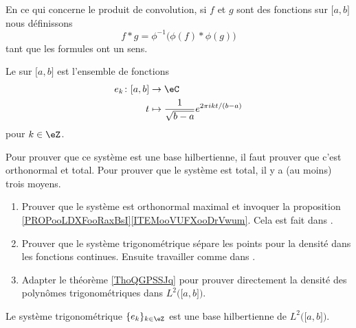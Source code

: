 \begin{definition}
	En ce qui concerne le produit de convolution, si \( f\) et \( g\) sont des fonctions sur \( \mathopen[ a , b \mathclose]\) nous définissons
	\begin{equation}
		f*g=\phi^{-1}\big( \phi(f)*\phi(g) \big)
	\end{equation}
	tant que les formules ont un sens.
\end{definition}

\begin{definition}
	Le  sur \( \mathopen[ a , b \mathclose]\) est l'ensemble de fonctions
	\begin{equation}
		\begin{aligned}
			e_k\colon \mathopen[ a , b \mathclose] & \to \eC                                               \\
			t                                      & \mapsto  \frac{1}{ \sqrt{ b-a } } e^{2\pi i kt/(b-a)}
		\end{aligned}
	\end{equation}
	pour \( k\in \eZ\).
\end{definition}

\begin{normaltext}
	Pour prouver que ce système est une base hilbertienne, il faut prouver que c'est orthonormal et total. Pour prouver que le système est total, il y a (au moins) trois moyens.
	\begin{enumerate}
		\item
		      Prouver que le système est orthonormal maximal et invoquer la proposition \ref{PROPooLDXFooRaxBsI}\ref{ITEMooVUFXooDrVwum}. Cela est fait dans \cite{BIBooZYKMooGGbwyI}.
		\item
		      Prouver que le système trigonométrique sépare les points pour la densité dans les fonctions continues. Ensuite travailler comme dans \cite{BIBooQLKHooOlskCs}.
		\item
		      Adapter le théorème \ref{ThoQGPSSJq} pour prouver directement la densité des polynômes trigonométriques dans \( L^2\big( \mathopen[ a , b \mathclose] \big)\).
	\end{enumerate}
\end{normaltext}

\begin{theorem}       \label{THOooAVWIooDhnjpN}
	Le système trigonométrique \( \{ e_k \}_{k\in \eZ}\) est une base hilbertienne de \( L^2\big( \mathopen[ a , b \mathclose] \big)\).
\end{theorem}

